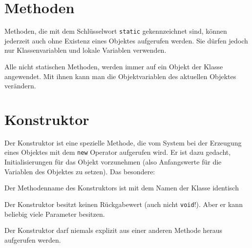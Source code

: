\section{Methoden}

Methoden, die mit dem Schlüsselwort \lstinline|static| gekennzeichnet sind,
können jederzeit auch ohne Existenz eines Objektes aufgerufen werden. Sie
dürfen jedoch nur Klassenvariablen und lokale Variablen verwenden.

Alle nicht statischen Methoden, werden immer auf ein Objekt der Klasse
angewendet. Mit ihnen kann man die Objektvariablen des aktuellen Objektes
verändern.


\section{Konstruktor}

Der Konstruktor ist eine spezielle Methode, die vom System bei der Erzeugung
eines Objektes mit dem \lstinline|new| Operator aufgerufen wird. Er ist dazu
gedacht, Initialisierungen für das Objekt vorzunehmen (also Anfangswerte für
die Variablen des Objektes zu setzen). Das besondere:

\begin{compactitem}
\item Der Methodenname des Konstruktors ist mit dem Namen der Klasse identisch
\item Der Konstruktor besitzt keinen Rückgabewert (auch nicht
\lstinline|void|!). Aber er kann beliebig viele Parameter besitzen.
\item Der Konstruktor darf niemals explizit aus einer anderen Methode heraus
aufgerufen werden.
\end{compactitem}